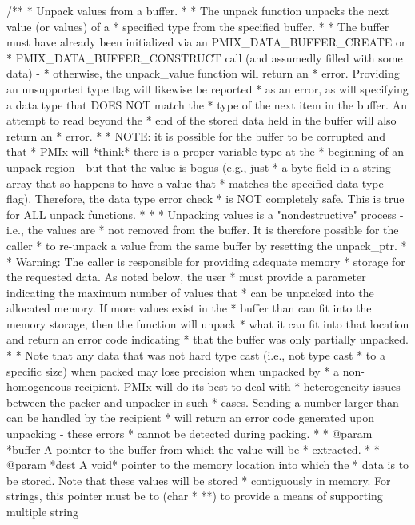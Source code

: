 \cspecificstart
\begin{codepar}
/**
 * Unpack values from a buffer.
 *
 * The unpack function unpacks the next value (or values) of a
 * specified type from the specified buffer.
 *
 * The buffer must have already been initialized via an PMIX_DATA_BUFFER_CREATE or
 * PMIX_DATA_BUFFER_CONSTRUCT call (and assumedly filled with some data) -
 * otherwise, the unpack_value function will return an
 * error. Providing an unsupported type flag will likewise be reported
 * as an error, as will specifying a data type that DOES NOT match the
 * type of the next item in the buffer. An attempt to read beyond the
 * end of the stored data held in the buffer will also return an
 * error.
 *
 * NOTE: it is possible for the buffer to be corrupted and that
 * PMIx will *think* there is a proper variable type at the
 * beginning of an unpack region - but that the value is bogus (e.g., just
 * a byte field in a string array that so happens to have a value that
 * matches the specified data type flag). Therefore, the data type error check
 * is NOT completely safe. This is true for ALL unpack functions.
 *
 *
 * Unpacking values is a "nondestructive" process - i.e., the values are
 * not removed from the buffer. It is therefore possible for the caller
 * to re-unpack a value from the same buffer by resetting the unpack_ptr.
 *
 * Warning: The caller is responsible for providing adequate memory
 * storage for the requested data. As noted below, the user
 * must provide a parameter indicating the maximum number of values that
 * can be unpacked into the allocated memory. If more values exist in the
 * buffer than can fit into the memory storage, then the function will unpack
 * what it can fit into that location and return an error code indicating
 * that the buffer was only partially unpacked.
 *
 * Note that any data that was not hard type cast (i.e., not type cast
 * to a specific size) when packed may lose precision when unpacked by
 * a non-homogeneous recipient.  PMIx will do its best to deal with
 * heterogeneity issues between the packer and unpacker in such
 * cases. Sending a number larger than can be handled by the recipient
 * will return an error code generated upon unpacking - these errors
 * cannot be detected during packing.
 *
 * @param *buffer A pointer to the buffer from which the value will be
 * extracted.
 *
 * @param *dest A void* pointer to the memory location into which the
 * data is to be stored. Note that these values will be stored
 * contiguously in memory. For strings, this pointer must be to (char
 * **) to provide a means of supporting multiple string

\end{codepar}
